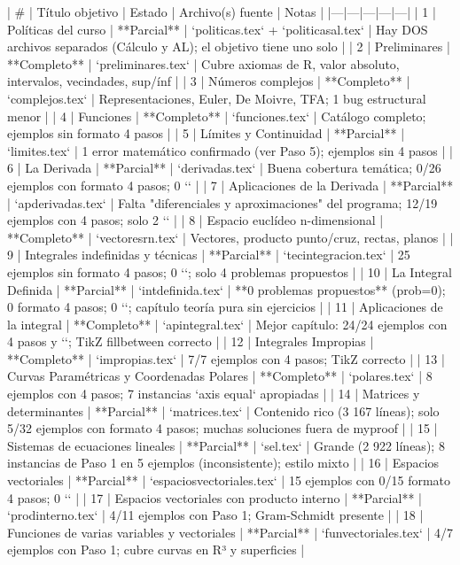 | # | Título objetivo | Estado | Archivo(s) fuente | Notas |
|---|---|---|---|---|
| 1 | Políticas del curso | **Parcial** | `politicas.tex` + `politicasal.tex` | Hay DOS archivos separados (Cálculo y AL); el objetivo tiene uno solo |
| 2 | Preliminares | **Completo** | `preliminares.tex` | Cubre axiomas de R, valor absoluto, intervalos, vecindades, sup/ínf |
| 3 | Números complejos | **Completo** | `complejos.tex` | Representaciones, Euler, De Moivre, TFA; 1 bug estructural menor |
| 4 | Funciones | **Completo** | `funciones.tex` | Catálogo completo; ejemplos sin formato 4 pasos |
| 5 | Límites y Continuidad | **Parcial** | `limites.tex` | 1 error matemático confirmado (ver Paso 5); ejemplos sin 4 pasos |
| 6 | La Derivada | **Parcial** | `derivadas.tex` | Buena cobertura temática; 0/26 ejemplos con formato 4 pasos; 0 `\boxed` |
| 7 | Aplicaciones de la Derivada | **Parcial** | `apderivadas.tex` | Falta "diferenciales y aproximaciones" del programa; 12/19 ejemplos con 4 pasos; solo 2 `\boxed` |
| 8 | Espacio euclídeo n-dimensional | **Completo** | `vectoresrn.tex` | Vectores, producto punto/cruz, rectas, planos |
| 9 | Integrales indefinidas y técnicas | **Parcial** | `tecintegracion.tex` | 25 ejemplos sin formato 4 pasos; 0 `\boxed`; solo 4 problemas propuestos |
| 10 | La Integral Definida | **Parcial** | `intdefinida.tex` | **0 problemas propuestos** (prob=0); 0 formato 4 pasos; 0 `\boxed`; capítulo teoría pura sin ejercicios |
| 11 | Aplicaciones de la integral | **Completo** | `apintegral.tex` | Mejor capítulo: 24/24 ejemplos con 4 pasos y `\boxed`; TikZ fillbetween correcto |
| 12 | Integrales Impropias | **Completo** | `impropias.tex` | 7/7 ejemplos con 4 pasos; TikZ correcto |
| 13 | Curvas Paramétricas y Coordenadas Polares | **Completo** | `polares.tex` | 8 ejemplos con 4 pasos; 7 instancias `axis equal` apropiadas |
| 14 | Matrices y determinantes | **Parcial** | `matrices.tex` | Contenido rico (3 167 líneas); solo 5/32 ejemplos con formato 4 pasos; muchas soluciones fuera de myproof |
| 15 | Sistemas de ecuaciones lineales | **Parcial** | `sel.tex` | Grande (2 922 líneas); 8 instancias de Paso 1 en 5 ejemplos (inconsistente); estilo mixto |
| 16 | Espacios vectoriales | **Parcial** | `espaciosvectoriales.tex` | 15 ejemplos con 0/15 formato 4 pasos; 0 `\boxed` |
| 17 | Espacios vectoriales con producto interno | **Parcial** | `prodinterno.tex` | 4/11 ejemplos con Paso 1; Gram-Schmidt presente |
| 18 | Funciones de varias variables y vectoriales | **Parcial** | `funvectoriales.tex` | 4/7 ejemplos con Paso 1; cubre curvas en R³ y superficies |
